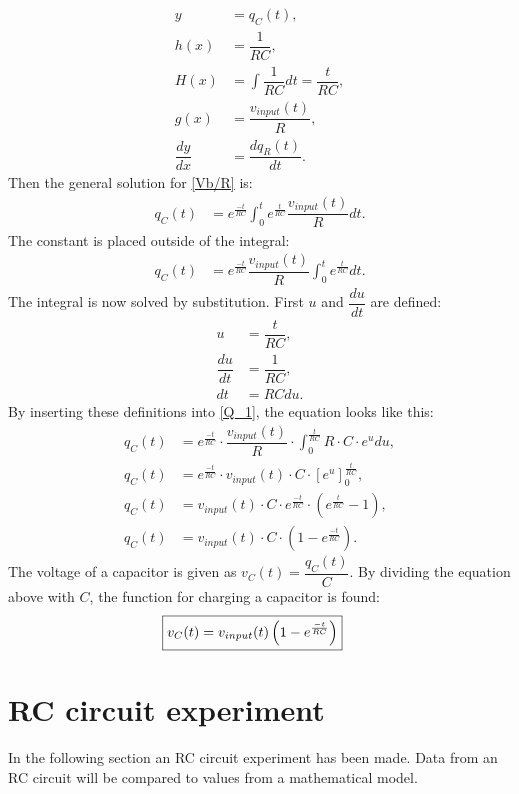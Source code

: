\begin{align*}
y &= q_C(t),
\\
h(x) &= \dfrac{1}{RC},
\\
H(x) &= \int \dfrac{1}{RC}dt=\dfrac{t}{RC},
\\
g(x) &= \dfrac{v_{input}(t)}{R},
\\
\dfrac{dy}{dx} &= \dfrac{dq_R(t)}{dt}.
\end{align*}
Then the general solution for \eqref{Vb/R} is:
\begin{align*}
q_C(t) &= e^{\frac{-t}{RC}}\int_{0}^{t}e^{\frac{t}{RC}}\dfrac{v_{input}(t)}{R}dt.
\end{align*}
The constant is placed outside of the integral:
\begin{align}
q_C(t) &= e^{\frac{-t}{RC}}\dfrac{v_{input}(t)}{R}\int_{0}^{t}e^{\frac{t}{RC}}dt. \label{Q_1}
\end{align}
The integral is now solved by substitution. First $u$ and $\dfrac{du}{dt}$ are defined:
\begin{align*}
u &= \dfrac{t}{RC},
\\
\dfrac{du}{dt}&=\dfrac{1}{RC},
\\
dt &=RC du.
\end{align*} 
By inserting these definitions into \eqref{Q_1}, the equation looks like this:
\begin{align*}
q_C(t) &= e^{\frac{-t}{RC}} \cdot \dfrac{v_{input}(t)}{R}\cdot \int_{0}^{\frac{t}{RC}} R \cdot C \cdot e^u du,
\\
q_C(t) &= e^{\frac{-t}{RC}}\cdot v_{input}(t)\cdot C\cdot \left[e^u\right]_{0}^{\frac{t}{RC}},
\\
q_C(t) &= v_{input}(t) \cdot C\cdot e^{\frac{-t}{RC}}\cdot\left(e^{\frac{t}{RC}}-1\right),
\\
q_C(t) &= v_{input}(t) \cdot C \cdot \left(1-e^{\frac{-t}{RC}}\right).
\end{align*} 
The voltage of a capacitor is given as $v_C(t)=\dfrac{q_C(t)}{C}$. By dividing the equation above with $C$, the function for charging a capacitor is found:
\begin{align}
\label{V_up}
\Aboxed{
v_C(t)=v_{input}(t)\left(1-e^{\frac{-t}{RC}}\right)
}
\end{align}
\section{RC circuit experiment} \label{c: RC_exp}
In the following section an RC circuit experiment has been made. Data from an RC circuit will be compared to values from a mathematical model.

